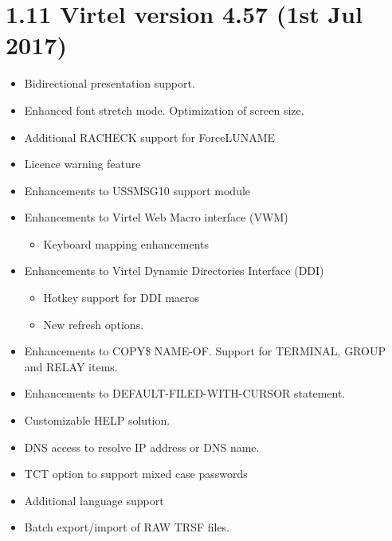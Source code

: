 \documentclass[letterpaper,10pt,english]{sphinxmanual}
\begin{document}
\section{1.11 Virtel version 4.57 (1st Jul 2017)}
\label{\detokenize{Installation_Guide:virtel-version-4-57-1st-jul-2017}}
\begin{itemize}
\item {} 
Bidirectional presentation support.

\item {} 
Enhanced font stretch mode. Optimization of screen size.

\item {} 
Additional RACHECK support for ForceLUNAME

\item {} 
Licence warning feature

\item {} 
Enhancements to USSMSG10 support module

\item {} 
Enhancements to Virtel Web Macro interface (VWM)
\begin{itemize}
\item {} 
Keyboard mapping enhancements

\end{itemize}

\item {} 
Enhancements to Virtel Dynamic Directories Interface (DDI)
\begin{itemize}
\item {} 
Hotkey support for DDI macros

\item {} 
New refresh options.

\end{itemize}

\end{itemize}

\begin{itemize}
\item {} 
Enhancements to COPY\$ NAME-OF. Support for TERMINAL, GROUP and RELAY items.

\item {} 
Enhancements to DEFAULT-FILED-WITH-CURSOR statement.

\end{itemize}

\begin{itemize}
\item {} 
Customizable HELP solution.

\item {} 
DNS access to resolve IP address or DNS name.

\item {} 
TCT option to support mixed case passwords

\item {} 
Additional language support

\item {} 
Batch export/import of RAW TRSF files.

\end{itemize}
\end{document}
